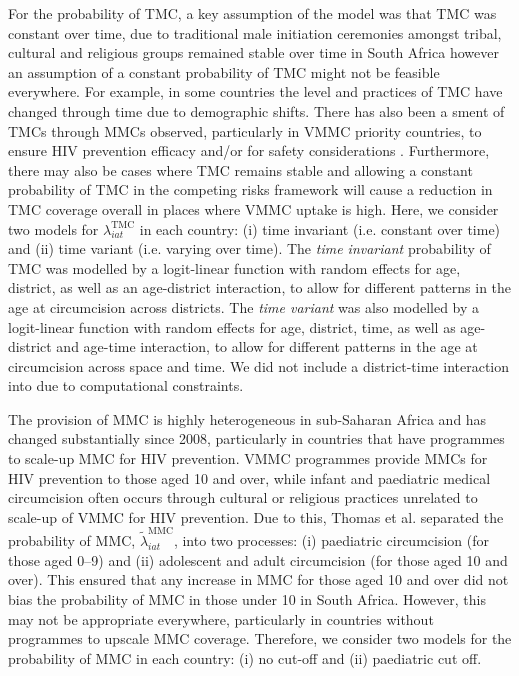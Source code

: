 \documentclass{article}
\begin{document}
For the probability of TMC, a key assumption of the \cite{thomas2021multilevel} model was that TMC was constant over time, due to traditional male initiation ceremonies amongst tribal, cultural and religious groups remained stable over time in South Africa however an assumption of a constant probability of TMC might not be feasible everywhere. For example, in some countries the level and practices of TMC have changed through time due to demographic shifts. There has also been a sment of TMCs through MMCs observed, particularly in VMMC priority countries, to ensure HIV prevention efficacy and/or for safety considerations \cite{thomas2021multilevel}. Furthermore, there may also be cases where TMC remains stable and allowing a constant probability of TMC in the competing risks framework will cause a reduction in TMC coverage overall in places where VMMC uptake is high. Here, we consider two models for $\lambda^{\text{TMC}}_{iat}$ in each country: (i) time invariant (i.e. constant over time) and (ii) time variant (i.e. varying over time). The {\it time invariant} probability of TMC was modelled by a logit-linear function with random effects for age, district, as well as an age-district interaction, to allow for different patterns in the age at circumcision across districts. The {\it time variant} was also modelled by a logit-linear function with random effects for age, district, time, as well as age-district and age-time interaction, to allow for different patterns in the age at circumcision across space and time. We did not include a district-time interaction into due to computational constraints. 

The provision of MMC is highly heterogeneous in sub-Saharan Africa and has changed substantially since 2008, particularly in countries that have programmes to scale-up MMC for HIV prevention. VMMC programmes provide MMCs for HIV prevention to those aged 10 and over, while infant and paediatric medical circumcision often occurs through cultural or religious practices unrelated to scale-up of VMMC for HIV prevention. Due to this, Thomas et al. \cite{thomas2021multilevel} separated the probability of MMC, $\tilde{\lambda}^{\text{MMC}}_{iat}$, into two processes: (i) paediatric circumcision (for those aged 0--9) and (ii) adolescent and adult circumcision (for those aged 10 and over). This ensured that any increase in MMC for those aged 10 and over did not bias the probability of MMC in those under 10 in South Africa. However, this may not be appropriate everywhere, particularly in countries without programmes to upscale MMC coverage. Therefore, we consider two models for the probability of MMC in each country: (i) no cut-off and (ii) paediatric cut off.
\end{document}
